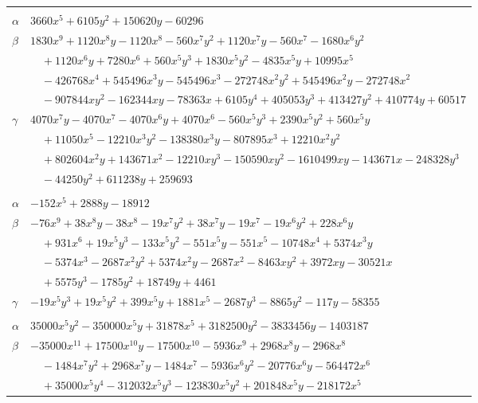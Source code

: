 \documentclass[11pt]{article}
\begin{document}
\begin{longtable}{@{}ll@{}}
\addlinespace[3pt]
\multicolumn{2}{@{}l}{$\{i,j\}=\{12,27\}$, $k_{ij}=13\cdot 17$}\\
$\alpha$ & $3660x^{5}+6105y^{2}+150620y-60296$\\
$\beta$ & $1830x^{9}+1120x^{8}y-1120x^{8}-560x^{7}y^{2}+1120x^{7}y-560x^{7}-1680x^{6}y^{2}$\\
 & $\quad +1120x^{6}y+7280x^{6}+560x^{5}y^{3}+1830x^{5}y^{2}-4835x^{5}y+10995x^{5}$\\
 & $\quad -426768x^{4}+545496x^{3}y-545496x^{3}-272748x^{2}y^{2}+545496x^{2}y-272748x^{2}$\\
 & $\quad -907844xy^{2}-162344xy-78363x+6105y^{4}+405053y^{3}+413427y^{2}+410774y+60517$\\
$\gamma$ & $4070x^{7}y-4070x^{7}-4070x^{6}y+4070x^{6}-560x^{5}y^{3}+2390x^{5}y^{2}+560x^{5}y$\\
 & $\quad +11050x^{5}-12210x^{3}y^{2}-138380x^{3}y-807895x^{3}+12210x^{2}y^{2}$\\
 & $\quad +802604x^{2}y+143671x^{2}-12210xy^{3}-150590xy^{2}-1610499xy-143671x-248328y^{3}$\\
 & $\quad -44250y^{2}+611238y+259693$\\
\addlinespace[3pt]
\multicolumn{2}{@{}l}{$\{i,j\}=\{12,35\}$, $k_{ij}=2^{7}\cdot 7^{3}$}\\
$\alpha$ & $-152x^{5}+2888y-18912$\\
$\beta$ & $-76x^{9}+38x^{8}y-38x^{8}-19x^{7}y^{2}+38x^{7}y-19x^{7}-19x^{6}y^{2}+228x^{6}y$\\
 & $\quad +931x^{6}+19x^{5}y^{3}-133x^{5}y^{2}-551x^{5}y-551x^{5}-10748x^{4}+5374x^{3}y$\\
 & $\quad -5374x^{3}-2687x^{2}y^{2}+5374x^{2}y-2687x^{2}-8463xy^{2}+3972xy-30521x$\\
 & $\quad +5575y^{3}-1785y^{2}+18749y+4461$\\
$\gamma$ & $-19x^{5}y^{3}+19x^{5}y^{2}+399x^{5}y+1881x^{5}-2687y^{3}-8865y^{2}-117y-58355$\\
\addlinespace[3pt]
\multicolumn{2}{@{}l}{$\{i,j\}=\{12,41\}$, $k_{ij}=2\cdot 3\cdot 7$}\\
$\alpha$ & $35000x^{5}y^{2}-350000x^{5}y+31878x^{5}+3182500y^{2}-3833456y-1403187$\\
$\beta$ & $-35000x^{11}+17500x^{10}y-17500x^{10}-5936x^{9}+2968x^{8}y-2968x^{8}$\\
 & $\quad -1484x^{7}y^{2}+2968x^{7}y-1484x^{7}-5936x^{6}y^{2}-20776x^{6}y-564472x^{6}$\\
 & $\quad +35000x^{5}y^{4}-312032x^{5}y^{3}-123830x^{5}y^{2}+201848x^{5}y-218172x^{5}$\\

\end{longtable}
\end{document}
